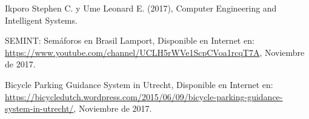 \begin{thebibliography}{9}
	Ikporo Stephen C. y Ume Leonard E. (2017),
	Computer Engineering and Intelligent Systems.
	
	SEMINT: Semáforos en Brasil Lamport,
	Disponible en Internet en: \url{https://www.youtube.com/channel/UCLH5rWVe1ScpCVoa1rcqT7A},
	Noviembre de 2017.
	
	Bicycle Parking Guidance System in Utrecht,
	Disponible en Internet en: \url{https://bicycledutch.wordpress.com/2015/06/09/bicycle-parking-guidance-system-in-utrecht/},
	Noviembre de 2017.
\end{thebibliography}

